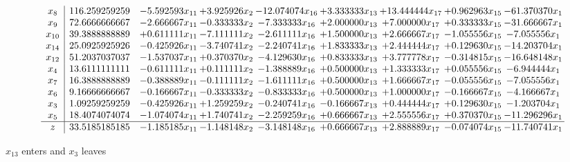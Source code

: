 \documentclass[10pt]{article}
\begin{document}
 \[\begin{array}{c| c c@{\hskip 2pt} c@{\hskip 2pt} c@{\hskip 2pt} c@{\hskip 2pt} c@{\hskip 2pt} c@{\hskip 2pt} c@{\hskip 2pt} }
 x_{8}   &  116.259259259 & -5.592593 x_{11} & + 3.925926 x_{2} & -12.074074 x_{16} & + 3.333333 x_{13} & + 13.444444 x_{17} & + 0.962963 x_{15} & -61.370370 x_{1}\\
 x_{9}   &  72.6666666667 & -2.666667 x_{11} & -0.333333 x_{2} & -7.333333 x_{16} & + 2.000000 x_{13} & + 7.000000 x_{17} & + 0.333333 x_{15} & -31.666667 x_{1}\\
 x_{10}   &  39.3888888889 & + 0.611111 x_{11} & -7.111111 x_{2} & -2.611111 x_{16} & + 1.500000 x_{13} & + 2.666667 x_{17} & -1.055556 x_{15} & -7.055556 x_{1}\\
 x_{14}   &  25.0925925926 & -0.425926 x_{11} & -3.740741 x_{2} & -2.240741 x_{16} & + 1.833333 x_{13} & + 2.444444 x_{17} & + 0.129630 x_{15} & -14.203704 x_{1}\\
 x_{12}   &  51.2037037037 & -1.537037 x_{11} & + 0.370370 x_{2} & -4.129630 x_{16} & + 0.833333 x_{13} & + 3.777778 x_{17} & -0.314815 x_{15} & -16.648148 x_{1}\\
 x_{4}   &  13.6111111111 & -0.611111 x_{11} & + 0.111111 x_{2} & -1.388889 x_{16} & + 0.500000 x_{13} & + 1.333333 x_{17} & + 0.055556 x_{15} & -6.944444 x_{1}\\
 x_{7}   &  16.3888888889 & -0.388889 x_{11} & -0.111111 x_{2} & -1.611111 x_{16} & + 0.500000 x_{13} & + 1.666667 x_{17} & -0.055556 x_{15} & -7.055556 x_{1}\\
 x_{6}   &  9.16666666667 & -0.166667 x_{11} & -0.333333 x_{2} & -0.833333 x_{16} & + 0.500000 x_{13} & + 1.000000 x_{17} & -0.166667 x_{15} & -4.166667 x_{1}\\
 x_{3}   &  1.09259259259 & -0.425926 x_{11} & + 1.259259 x_{2} & -0.240741 x_{16} & -0.166667 x_{13} & + 0.444444 x_{17} & + 0.129630 x_{15} & -1.203704 x_{1}\\
 x_{5}   &  18.4074074074 & -1.074074 x_{11} & + 1.740741 x_{2} & -2.259259 x_{16} & + 0.666667 x_{13} & + 2.555556 x_{17} & + 0.370370 x_{15} & -11.296296 x_{1}\\
\hline
z    &  33.5185185185 & -1.185185 x_{11} & -1.148148 x_{2} & -3.148148 x_{16} & + 0.666667 x_{13} & + 2.888889 x_{17} & -0.074074 x_{15} & -11.740741 x_{1}\\
\end{array}\]


 $ x_{13} $ enters and $ x_{3} $ leaves 
\end{document}
